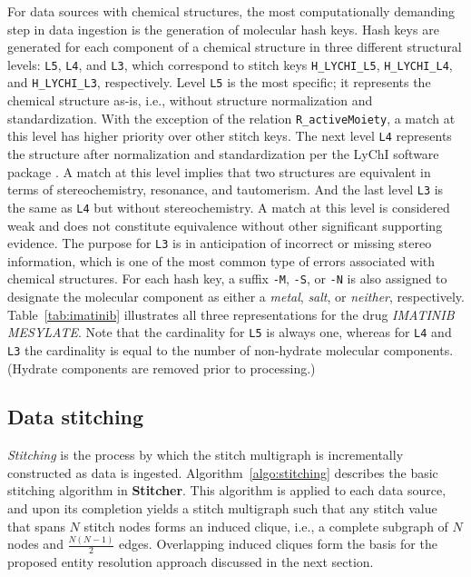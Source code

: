 \documentclass{bioinfo}
\newcommand\st{\textbf{Stitcher}}
\begin{document}
\begin{methods}
For data sources with chemical structures, the most computationally demanding step in data ingestion is the generation of molecular hash keys. Hash keys are generated for each component of a chemical structure in three different structural levels: \texttt{L5}, \texttt{L4}, and \texttt{L3}, which correspond to stitch keys \texttt{H\_LYCHI\_L5}, \texttt{H\_LYCHI\_L4}, and \texttt{H\_LYCHI\_L3}, respectively. Level \texttt{L5} is the most specific; it represents the chemical structure as-is, i.e., without structure normalization and standardization. With the exception of the relation \texttt{R\_activeMoiety}, a match at this level has higher priority over other stitch keys. The next level \texttt{L4} represents the structure after normalization and standardization per the LyChI software package \citep{lychi}. A match at this level implies that two structures are equivalent
in terms of stereochemistry, resonance, and tautomerism. And the last level \texttt{L3} is the same as \texttt{L4} but without stereochemistry. A match at this level is considered weak and does not constitute equivalence without other significant supporting evidence. The purpose for \texttt{L3} is in anticipation of incorrect or missing stereo information, which is one of the most common type of errors associated with chemical structures. For each hash key, a suffix \texttt{-M}, \texttt{-S}, or \texttt{-N} is also assigned to designate the molecular component as either a \emph{metal}, \emph{salt}, or \emph{neither}, respectively. Table~\ref{tab:imatinib} illustrates all three representations for the drug \emph{IMATINIB MESYLATE}. Note that the cardinality for \texttt{L5} is always one, whereas for \texttt{L4} and \texttt{L3} the cardinality is equal to the number of non-hydrate molecular components. (Hydrate components are removed prior to processing.)

\subsection{Data stitching}
\emph{Stitching} is the process by which the stitch multigraph is incrementally constructed as data is ingested. Algorithm~\ref{algo:stitching} describes the basic stitching algorithm in \st. This algorithm is applied to each data source, and upon its completion yields a stitch multigraph such that any stitch value that spans $N$ stitch nodes forms an induced clique, i.e., a complete subgraph of $N$ nodes and $\frac{N(N-1)}{2}$ edges. Overlapping induced cliques form the basis for the proposed entity resolution approach discussed in the next section.


\end{methods}
\end{document}
